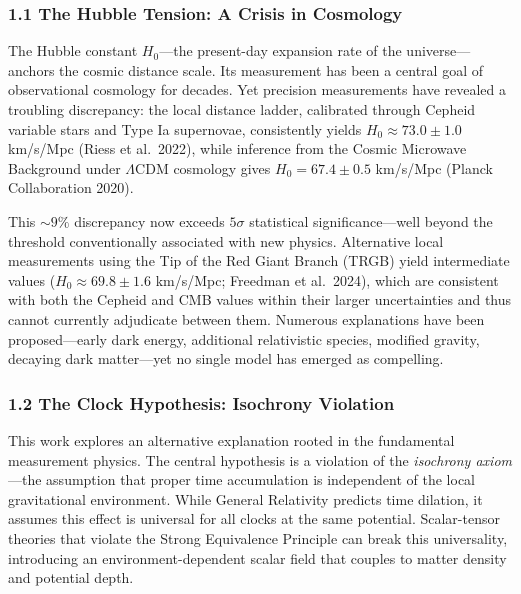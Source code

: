 \documentclass[
]{article}
\begin{document}
\subsubsection{1.1 The Hubble Tension: A Crisis in
Cosmology}\label{the-hubble-tension-a-crisis-in-cosmology}

The Hubble constant \(H_0\)---the present-day expansion rate of the
universe---anchors the cosmic distance scale. Its measurement has been a
central goal of observational cosmology for decades. Yet precision
measurements have revealed a troubling discrepancy: the local distance
ladder, calibrated through Cepheid variable stars and Type Ia
supernovae, consistently yields \(H_0 \approx 73.0 \pm 1.0\) km/s/Mpc
(Riess et al.~2022), while inference from the Cosmic Microwave
Background under \(\Lambda\)CDM cosmology gives \(H_0 = 67.4 \pm 0.5\)
km/s/Mpc (Planck Collaboration 2020).

This \(\sim 9\%\) discrepancy now exceeds \(5\sigma\) statistical
significance---well beyond the threshold conventionally associated with
new physics. Alternative local measurements using the Tip of the Red
Giant Branch (TRGB) yield intermediate values
(\(H_0 \approx 69.8 \pm 1.6\) km/s/Mpc; Freedman et al.~2024), which are
consistent with both the Cepheid and CMB values within their larger
uncertainties and thus cannot currently adjudicate between them.
Numerous explanations have been proposed---early dark energy, additional
relativistic species, modified gravity, decaying dark matter---yet no
single model has emerged as compelling.

\subsubsection{1.2 The Clock Hypothesis: Isochrony
Violation}\label{the-clock-hypothesis-isochrony-violation}

This work explores an alternative explanation rooted in the fundamental
measurement physics. The central hypothesis is a violation of the
\emph{isochrony axiom}---the assumption that proper time accumulation is
independent of the local gravitational environment. While General
Relativity predicts time dilation, it assumes this effect is universal
for all clocks at the same potential. Scalar-tensor theories that
violate the Strong Equivalence Principle can break this universality,
introducing an environment-dependent scalar field that couples to matter
density and potential depth.
\end{document}
